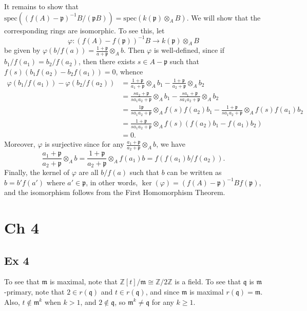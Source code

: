 \documentclass{article}
\let\temp\phi
\let\phi\varphi
\let\varphi\temp
\theoremstyle{definition}
\newcommand{\spec}{\text{spec}}
\begin{document}
It remains to show that $\spec((f(A) - \mathfrak{p})^{-1} B/(\mathfrak{p}B)) =
\spec(k(\mathfrak{p}) \otimes_{A} B)$. We will show that the corresponding
rings are isomorphic. To see this, let 
\[
	\phi : (f(A) - f(\mathfrak{p}))^{-1}B \to k(\mathfrak{p}) \otimes_{A} B
\] 
be given by $\phi(b/f(a)) = \frac{1 + \mathfrak{p}}{a + \mathfrak{p}} \otimes_{A} b$.
Then $\phi$ is well-defined, since if $b_1/f(a_1) = b_2/f(a_2)$, then there exists
$s \in A - \mathfrak{p}$ such that $f(s)(b_1f(a_2) - b_2f(a_1)) = 0$, whence 
\begin{align*}
	\phi(b_1/f(a_1)) - \phi(b_2/f(a_2))
	&=
	\frac{1 + \mathfrak{p}}{a_1 + \mathfrak{p}} \otimes_A b_1
	-
	\frac{1 + \mathfrak{p}}{a_2 + \mathfrak{p}} \otimes_A b_2 \\
	&=
	\frac{sa_2 + \mathfrak{p}}{sa_1a_2 + \mathfrak{p}} \otimes_A b_1
	-
	\frac{sa_1 + \mathfrak{p}}{sa_1a_2 + \mathfrak{p}} \otimes_A b_2 \\
	&=
	\frac{1 \mathfrak{p}}{sa_1a_2 + \mathfrak{p}} \otimes_A f(s)f(a_2)b_1
	-
	\frac{1 + \mathfrak{p}}{sa_1a_2 + \mathfrak{p}} \otimes_A f(s)f(a_1)b_2 \\
	&=
	\frac{1 + \mathfrak{p}}{sa_1a_2 + \mathfrak{p}} \otimes_A f(s)(f(a_2)b_1 - f(a_1)b_2) \\
	&=
	0.
\end{align*}
Moreover, $\phi$ is surjective since for any $\frac{a_1 + \mathfrak{p}}{a_2 + \mathfrak{p}} \otimes_A b$,
we have 
\[
\frac{a_1 + \mathfrak{p}}{a_2 + \mathfrak{p}} \otimes_A b
=
\frac{1 + \mathfrak{p}}{a_2 + \mathfrak{p}} \otimes_A f(a_1)b
=
f(f(a_1)b/f(a_2)).
\] 
Finally, the kernel of $\phi$ are all $b/f(a)$ such that $b$ can be written as
$b = b'f(a')$ where $a' \in \mathfrak{p}$, in other words, $\ker(\phi) = (f(A)
- \mathfrak{p})^{-1}Bf(\mathfrak{p})$, and the isomorphism follows from the
First Homomorphism Theorem.


\section*{Ch 4}


\subsection*{Ex 4}
To see that $\mathfrak{m}$ is maximal, note that $\mathbb{Z}[t]/\mathfrak{m}
\cong \mathbb{Z}/2\mathbb{Z}$ is a field. To see that $\mathfrak{q}$ is
$\mathfrak{m}$-primary, note that $2 \in r(\mathfrak{q})$ and $t \in
r(\mathfrak{q})$, and since $\mathfrak{m}$ is maximal $r(\mathfrak{q}) =
\mathfrak{m}$. Also, $t \not \in \mathfrak{m}^{k}$ when $k > 1$, and $2 \not
\in \mathfrak{q}$, so $\mathfrak{m}^k \not = \mathfrak{q}$ for any $k \geq 1$.
\end{document}
